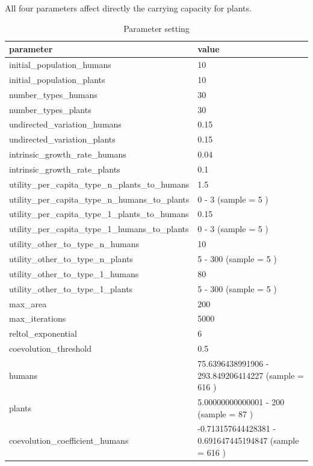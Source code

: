 \documentclass[
]{book}
\begin{document}

All four parameters affect directly the carrying capacity for plants.

\begin{table}[!h]

\caption{\label{tab:4UbPUHPtablepdf}Parameter setting}
\centering
\begin{tabular}[t]{l|l}
\hline
parameter & value\\
\hline
initial\_population\_humans & 10\\
\hline
initial\_population\_plants & 10\\
\hline
number\_types\_humans & 30\\
\hline
number\_types\_plants & 30\\
\hline
undirected\_variation\_humans & 0.15\\
\hline
undirected\_variation\_plants & 0.15\\
\hline
intrinsic\_growth\_rate\_humans & 0.04\\
\hline
intrinsic\_growth\_rate\_plants & 0.1\\
\hline
utility\_per\_capita\_type\_n\_plants\_to\_humans & 1.5\\
\hline
utility\_per\_capita\_type\_n\_humans\_to\_plants & 0 - 3 (sample = 5 )\\
\hline
utility\_per\_capita\_type\_1\_plants\_to\_humans & 0.15\\
\hline
utility\_per\_capita\_type\_1\_humans\_to\_plants & 0 - 3 (sample = 5 )\\
\hline
utility\_other\_to\_type\_n\_humans & 10\\
\hline
utility\_other\_to\_type\_n\_plants & 5 - 300 (sample = 5 )\\
\hline
utility\_other\_to\_type\_1\_humans & 80\\
\hline
utility\_other\_to\_type\_1\_plants & 5 - 300 (sample = 5 )\\
\hline
max\_area & 200\\
\hline
max\_iterations & 5000\\
\hline
reltol\_exponential & 6\\
\hline
coevolution\_threshold & 0.5\\
\hline
humans & 75.6396438991906 - 293.849206414227 (sample = 616 )\\
\hline
plants & 5.00000000000001 - 200 (sample = 87 )\\
\hline
coevolution\_coefficient\_humans & -0.713157644428381 - 0.691647445194847 (sample = 616 )\\

\end{tabular}
\end{table}
\end{document}

